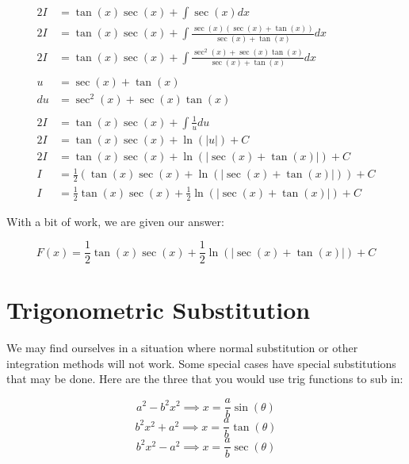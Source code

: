 \documentclass[12pt]{article}
\begin{document}
\begin{align}
    2I             & = \tan(x)\sec(x) + \int \sec(x) dx                                          \\
    2I             & = \tan(x)\sec(x) + \int \frac{\sec(x)(\sec(x)+\tan(x))}{\sec(x)+\tan(x)} dx \\
    2I             & = \tan(x)\sec(x) + \int \frac{\sec^2(x)+\sec(x)\tan(x)}{\sec(x)+\tan(x)} dx \\
    \nonumber                                                                                    \\
    u              & = \sec(x) + \tan(x)                                                         \\
    du             & = \sec^2(x) + \sec(x)\tan(x)                                                \\
    \nonumber                                                                                    \\
    2I             & = \tan(x)\sec(x) + \int \frac{1}{u} du                                      \\
    2I             & = \tan(x)\sec(x) + \ln(|u|) + C                                             \\
    2I             & = \tan(x)\sec(x) + \ln(|\sec(x) + \tan(x)|) + C                             \\
    I              & = \frac{1}{2}(\tan(x)\sec(x) + \ln(|\sec(x) + \tan(x)|)) + C                \\
    I              & = \frac{1}{2}\tan(x)\sec(x) + \frac{1}{2}\ln(|\sec(x) + \tan(x)|) + C
\end{align}


With a bit of work, we are given our answer:

$$
    F(x) = \frac{1}{2}\tan(x)\sec(x) + \frac{1}{2}\ln(|\sec(x) + \tan(x)|) + C
$$

\section{Trigonometric Substitution}

We may find ourselves in a situation where normal substitution or other integration methods will not work.
Some special cases have special substitutions that may be done.
Here are the three that you would use trig functions to sub in:

$$
    a^2 - b^2x^2 \implies x = \frac{a}{b}\sin(\theta)
$$
$$
    b^2x^2 + a^2 \implies x = \frac{a}{b}\tan(\theta)
$$
$$
    b^2x^2 - a^2 \implies x = \frac{a}{b}\sec(\theta)
$$
\end{document}
